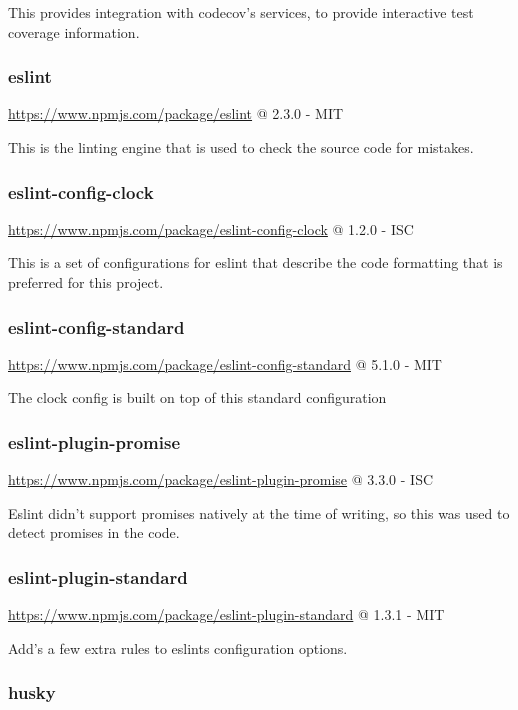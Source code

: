 This provides integration with codecov's services, to provide interactive test coverage information.

\subsubsection*{eslint}  

\url{https://www.npmjs.com/package/eslint} @ 2.3.0 - MIT

This is the linting engine that is used to check the source code for mistakes.

\subsubsection*{eslint-config-clock} 

\url{https://www.npmjs.com/package/eslint-config-clock} @ 1.2.0 - ISC

This is a set of configurations for eslint that describe the code formatting that is preferred for this project.

\subsubsection*{eslint-config-standard} 

\url{https://www.npmjs.com/package/eslint-config-standard} @ 5.1.0 - MIT

The clock config is built on top of this standard configuration

\subsubsection*{eslint-plugin-promise} 

\url{https://www.npmjs.com/package/eslint-plugin-promise} @ 3.3.0 - ISC

Eslint didn't support promises natively at the time of writing, so this was used to detect promises in the code.

\subsubsection*{eslint-plugin-standard} 

\url{https://www.npmjs.com/package/eslint-plugin-standard} @ 1.3.1 - MIT

Add's a few extra rules to eslints configuration options.

\subsubsection*{husky} 


